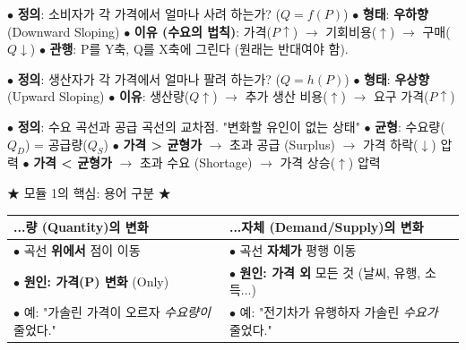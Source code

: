 \documentclass[11pt,a4paper]{article}
\theoremstyle{definition}
\begin{document}
\begin{tcolorbox}[title=\textbf{2. 수요 (Demand, $D_0$)}]
    $\bullet$ \textbf{정의}: 소비자가 각 가격에서 얼마나 사려 하는가? ($Q = f(P)$)
    \newline
    $\bullet$ \textbf{형태}: \textbf{우하향} (Downward Sloping)
    \newline
    $\bullet$ \textbf{이유 (수요의 법칙)}: 가격($P \uparrow$) $\rightarrow$ 기회비용($\uparrow$) $\rightarrow$ 구매($Q \downarrow$)
    \newline
    $\bullet$ \textbf{관행}: P를 Y축, Q를 X축에 그린다 (원래는 반대여야 함).
\end{tcolorbox}

\begin{tcolorbox}[title=\textbf{3. 공급 (Supply, $S_0$)}]
    $\bullet$ \textbf{정의}: 생산자가 각 가격에서 얼마나 팔려 하는가? ($Q = h(P)$)
    \newline
    $\bullet$ \textbf{형태}: \textbf{우상향} (Upward Sloping)
    \newline
    $\bullet$ \textbf{이유}: 생산량($Q \uparrow$) $\rightarrow$ 추가 생산 비용($\uparrow$) $\rightarrow$ 요구 가격($P \uparrow$)
\end{tcolorbox}

\begin{tcolorbox}[title=\textbf{4. 시장 균형 (Equilibrium, $E$)}]
    $\bullet$ \textbf{정의}: 수요 곡선과 공급 곡선의 교차점. "변화할 유인이 없는 상태"
    \newline
    $\bullet$ \textbf{균형}: 수요량($Q_D$) = 공급량($Q_S$)
    \newline
    $\bullet$ \textbf{가격 \textgreater{} 균형가} $\rightarrow$ 초과 공급 (Surplus) $\rightarrow$ 가격 하락($\downarrow$) 압력
    \newline
    $\bullet$ \textbf{가격 \textless{} 균형가} $\rightarrow$ 초과 수요 (Shortage) $\rightarrow$ 가격 상승($\uparrow$) 압력
\end{tcolorbox}

\begin{warningbox}{★ 모듈 1의 핵심: 용어 구분 ★}
\begin{tabularx}{\linewidth}{>{\raggedright}X >{\raggedright}X}
    \textbf{...량 (Quantity)의 변화} & \textbf{...자체 (Demand/Supply)의 변화} \\
    \midrule
    $\bullet$ 곡선 \textbf{위에서} 점이 이동 & $\bullet$ 곡선 \textbf{자체가} 평행 이동 \\
    $\bullet$ \textbf{원인: 가격(P) 변화} (Only) & $\bullet$ \textbf{원인: 가격 외} 모든 것 (날씨, 유행, 소득...) \\
    $\bullet$ 예: "가솔린 가격이 오르자 \textit{수요량이} 줄었다." & $\bullet$ 예: "전기차가 유행하자 가솔린 \textit{수요가} 줄었다." \\
\end{tabularx}
\end{warningbox}
\end{document}
